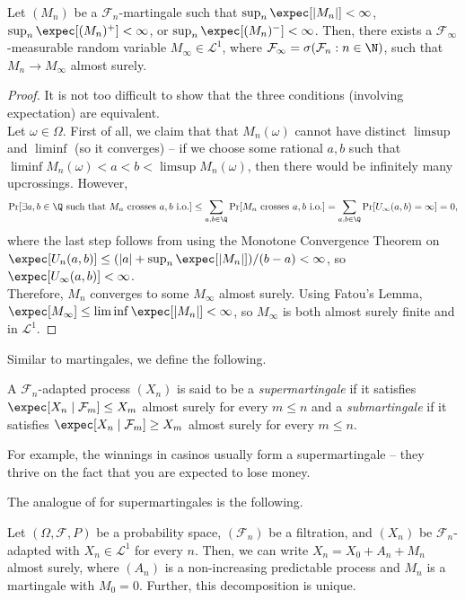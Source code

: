 		\begin{ftheo}
			\label{martingale convergence theorem}
			Let $(M_n)$ be a $\mathcal{F}_n$-martingale such that $\sup_n\expec[|M_n|]<\infty$, $\sup_n\expec[(M_n)^+]<\infty$, or $\sup_n\expec[(M_n)^-]<\infty$. Then, there exists a $\mathcal{F}_\infty$-measurable random variable $M_\infty\in\mathcal{L}^1$, where $\mathcal{F}_\infty = \sigma(\mathcal{F}_n : n\in\N)$, such that $M_n\to M_\infty$ almost surely.
		\end{ftheo}
		\begin{proof}
			It is not too difficult to show that the three conditions (involving expectation) are equivalent.\\
			Let $\omega\in\Omega$. First of all, we claim that that $M_n(\omega)$ cannot have distinct $\limsup$ and $\liminf$ (so it converges) -- if we choose some rational $a,b$ such that $\liminf M_n(\omega)<a<b<\limsup M_n(\omega)$, then there would be infinitely many upcrossings. However,
			\[ \Pr[\exists a,b\in\Q\text{ such that $M_n$ crosses $a,b$ i.o.}] \leq \sum_{a,b\in\Q} \Pr[M_n\text{ crosses $a,b$ i.o.}] = \sum_{a,b\in\Q}\Pr[U_\infty(a,b)=\infty] = 0, \]
			where the last step follows from using the Monotone Convergence Theorem on $\expec[U_n(a,b)] \leq (|a|+\sup_n\expec[|M_n|])/(b-a) < \infty$, so $\expec[U_\infty(a,b)]<\infty$.\\
			Therefore, $M_n$ converges to some $M_\infty$ almost surely. Using Fatou's Lemma, $\expec[M_\infty] \leq \liminf \expec[|M_n|] < \infty$, so $M_\infty$ is both almost surely finite and in $\mathcal{L}^1$.
		\end{proof}

		Similar to martingales, we define the following.

		\begin{definition}
			A $\mathcal{F}_n$-adapted process $(X_n)$ is said to be a \textit{supermartingale} if it satisfies $\expec[X_n\mid\mathcal{F}_m] \leq X_m$ almost surely for every $m\leq n$ and a \textit{submartingale} if it satisfies $\expec[X_n\mid\mathcal{F}_m] \geq X_m$ almost surely for every $m\leq n$. 
		\end{definition}

		For example, the winnings in casinos usually form a supermartingale -- they thrive on the fact that you are expected to lose money.

		The analogue of  for supermartingales is the following.

		\begin{lemma}
			Let $(\Omega,\mathcal{F},P)$ be a probability space, $(\mathcal{F}_n)$ be a filtration, and $(X_n)$ be $\mathcal{F}_n$-adapted with $X_n\in\mathcal{L}^1$ for every $n$. Then, we can write $X_n = X_0 + A_n + M_n$ almost surely, where $(A_n)$ is a non-increasing predictable process and $M_n$ is a martingale with $M_0=0$. Further, this decomposition is unique.
		\end{lemma}

